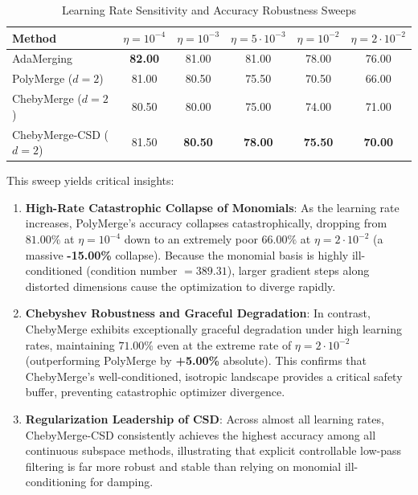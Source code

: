 \begin{table}[t]
\caption{Learning Rate Sensitivity and Accuracy Robustness Sweeps}
\label{tab:lr_sweep}
\vskip 0.15in
\begin{center}
\begin{small}
\setlength{\tabcolsep}{3.5pt}
\begin{tabular}{lccccc}
\toprule
Method & $\eta=10^{-4}$ & $\eta=10^{-3}$ & $\eta=5\cdot 10^{-3}$ & $\eta=10^{-2}$ & $\eta=2\cdot 10^{-2}$ \\
\midrule
AdaMerging & \textbf{82.00} & 81.00 & 81.00 & 78.00 & 76.00 \\
PolyMerge ($d=2$) & 81.00 & 80.50 & 75.50 & 70.50 & 66.00 \\
ChebyMerge ($d=2$) & 80.50 & 80.00 & 75.00 & 74.00 & 71.00 \\
ChebyMerge-CSD ($d=2$) & 81.50 & \textbf{80.50} & \textbf{78.00} & \textbf{75.50} & \textbf{70.00} \\
\bottomrule
\end{tabular}
\end{small}
\end{center}
\vskip -0.1in
\end{table}

This sweep yields critical insights:
\begin{enumerate}
    \item \textbf{High-Rate Catastrophic Collapse of Monomials}: As the learning rate increases, PolyMerge's accuracy collapses catastrophically, dropping from $81.00\%$ at $\eta=10^{-4}$ down to an extremely poor $66.00\%$ at $\eta=2\cdot 10^{-2}$ (a massive \textbf{-15.00\%} collapse). Because the monomial basis is highly ill-conditioned (condition number $= 389.31$), larger gradient steps along distorted dimensions cause the optimization to diverge rapidly.
    \item \textbf{Chebyshev Robustness and Graceful Degradation}: In contrast, ChebyMerge exhibits exceptionally graceful degradation under high learning rates, maintaining $71.00\%$ even at the extreme rate of $\eta=2\cdot 10^{-2}$ (outperforming PolyMerge by \textbf{+5.00\%} absolute). This confirms that ChebyMerge's well-conditioned, isotropic landscape provides a critical safety buffer, preventing catastrophic optimizer divergence.
    \item \textbf{Regularization Leadership of CSD}: Across almost all learning rates, ChebyMerge-CSD consistently achieves the highest accuracy among all continuous subspace methods, illustrating that explicit controllable low-pass filtering is far more robust and stable than relying on monomial ill-conditioning for damping.
\end{enumerate}

